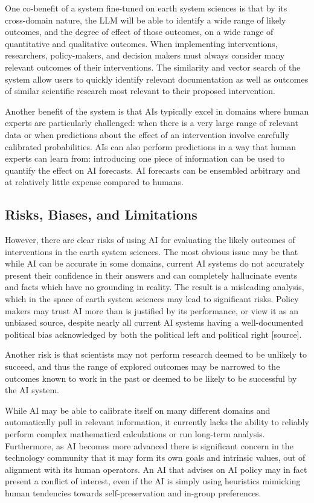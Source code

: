 \documentclass[12pt,a4paper]{article}
\begin{document}
One co-benefit of a system fine-tuned on earth system sciences is that by its cross-domain nature, the LLM will be able to identify a wide range of likely outcomes, and the degree of effect of those outcomes, on a wide range of quantitative and qualitative outcomes. When implementing interventions, researchers, policy-makers, and decision makers must always consider many relevant outcomes of their interventions. The similarity and vector search of the system allow users to quickly identify relevant documentation as well as outcomes of similar scientific research most relevant to their proposed intervention.

Another benefit of the system is that AIs typically excel in domains where human experts are particularly challenged: when there is a very large range of relevant data or when predictions about the effect of an intervention involve carefully calibrated probabilities. AIs can also perform predictions in a way that human experts can learn from: introducing one piece of information can be used to quantify the effect on AI forecasts. AI forecasts can be ensembled arbitrary and at relatively little expense compared to humans. 

\subsection{Risks, Biases, and Limitations}
However, there are clear risks of using AI for evaluating the likely outcomes of interventions in the earth system sciences. The most obvious issue may be that while AI can be accurate in some domains, current AI systems do not accurately present their confidence in their answers and can completely hallucinate events and facts which have no grounding in reality. The result is a misleading analysis, which in the space of earth system sciences may lead to significant risks. Policy makers may trust AI more than is justified by its performance, or view it as an unbiased source, despite nearly all current AI systems having a well-documented political bias acknowledged by both the political left and political right [source]. 

Another risk is that scientists may not perform research deemed to be unlikely to succeed, and thus the range of explored outcomes may be narrowed to the outcomes known to work in the past or deemed to be likely to be successful by the AI system. 

While AI may be able to calibrate itself on many different domains and automatically pull in relevant information, it currently lacks the ability to reliably perform complex mathematical calculations or run long-term analysis. Furthermore, as AI becomes more advanced there is significant concern in the technology community that it may form its own goals and intrinsic values, out of alignment with its human operators. An AI that advises on AI policy may in fact present a conflict of interest, even if the AI is simply using heuristics mimicking human tendencies towards self-preservation and in-group preferences. 
\end{document}
